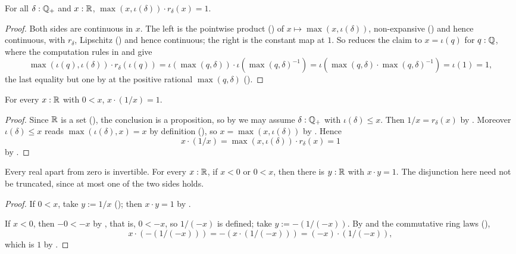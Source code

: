 \begin{lemma}
  \label{boundedRecipInvR}
  For all $\delta : \mathbb{Q}_{+}$ and $x : \mathbb{R}$, $\max(x, \iota(\delta)) \cdot r_\delta(x) = 1$.
\end{lemma}
\begin{proof}
  Both sides are continuous in $x$. The left is the pointwise product () of $x \mapsto \max(x, \iota(\delta))$, non-expansive () and hence continuous, with $r_\delta$, Lipschitz () and hence continuous; the right is the constant map at $1$. So  reduces the claim to $x = \iota(q)$ for $q : \mathbb{Q}$, where the computation rules in  and  give
  \[
    \max(\iota(q), \iota(\delta)) \cdot r_\delta(\iota(q))
      = \iota(\max(q, \delta)) \cdot \iota(\max(q, \delta)^{-1})
      = \iota(\max(q, \delta) \cdot \max(q, \delta)^{-1})
      = \iota(1) = 1,
  \]
  the last equality but one by  at the positive rational $\max(q, \delta)$ ().
\end{proof}

\begin{lemma}
  \label{recipInvR}
  For every $x : \mathbb{R}$ with $0 < x$, $x \cdot (1/x) = 1$.
\end{lemma}
\begin{proof}
  Since $\mathbb{R}$ is a set (), the conclusion is a proposition, so by  we may assume $\delta : \mathbb{Q}_{+}$ with $\iota(\delta) \le x$. Then $1/x = r_\delta(x)$ by . Moreover $\iota(\delta) \le x$ reads $\max(\iota(\delta), x) = x$ by definition (), so $x = \max(x, \iota(\delta))$ by . Hence
  \[
    x \cdot (1/x) = \max(x, \iota(\delta)) \cdot r_\delta(x) = 1
  \]
  by .
\end{proof}

\begin{lemma}
  \label{apartZeroIsInv}
  Every real apart from zero is invertible. For every $x : \mathbb{R}$, if $x < 0$ or $0 < x$, then there is $y : \mathbb{R}$ with $x \cdot y = 1$. The disjunction here need not be truncated, since at most one of the two sides holds.
\end{lemma}
\begin{proof}
  If $0 < x$, take $y := 1/x$ (); then $x \cdot y = 1$ by .

  If $x < 0$, then $-0 < -x$ by , that is, $0 < -x$, so $1/(-x)$ is defined; take $y := -(1/(-x))$. By  and the commutative ring laws (),
  \[
    x \cdot \left(-(1/(-x))\right) = -\left(x \cdot (1/(-x))\right) = (-x) \cdot (1/(-x)),
  \]
  which is $1$ by .
\end{proof}

